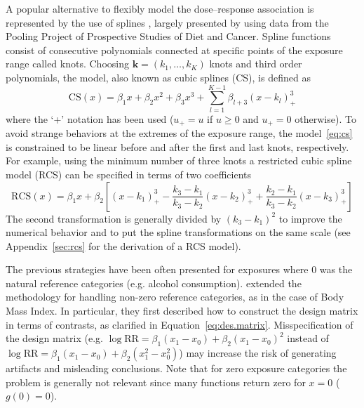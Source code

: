 \documentclass[11pt,a4paper,twoside,openany]{book}\usepackage{knitr}
\begin{document}
{{A popular alternative to flexibly model the dose--response association is represented by the use of splines \citep{de1978practical}, largely presented by \cite{orsini2011meta} using data from the Pooling Project of Prospective Studies of Diet and Cancer. Spline functions consist of consecutive polynomials connected at specific points of the exposure range called knots. Choosing $\mathbf{k} = \left(k_1, \dots, k_K\right)$ knots and third order polynomials, the model, also known as cubic splines (CS), is defined as
\begin{equation}
\mathrm{CS}(x) = \beta_1 x + \beta_2x^2 + \beta_3x^3 + \sum_{l = 1}^{K-1} \beta_{l+3}(x - k_l)_{+}^3
\label{eq:cs}
\end{equation}
\noindent where the `+' notation has been used ($u_+ = u$ if $u \ge 0$ and $u_+ = 0$ otherwise). To avoid strange behaviors at the extremes of the exposure range, the model~\ref{eq:cs} is constrained to be linear before and after the first and last knots, respectively. For example, using the minimum number of three knots a restricted cubic spline model (RCS) can be specified in terms of two coefficients
\begin{equation}
\mathrm{RCS}(x) = \beta_1 x + \beta_2 \left[ \left( x - k_1 \right)_{+}^3 - \frac{k_3 - k_1}{k_3 - k_2} \left( x - k_2  \right)_{+}^3 + \frac{k_2 - k_1}{k_3 - k_2} \left(x - k_3 \right)_{+}^3\right]
\label{eq:rcs}
\end{equation}
\noindent The second transformation is generally divided by $(k_3 - k_1)^2$ to improve the numerical behavior and to put the spline transformations on the same scale \citep{harrell2015regression} (see Appendix~\ref{sec:rcs} for the derivation of a RCS model).

The previous strategies have been often presented for exposures where 0 was the natural reference categories (e.g. alcohol consumption). \cite{liu2009two} extended the methodology for handling non-zero reference categories, as in the case of Body Mass Index. In particular, they first described how to construct the design matrix in terms of contrasts, as clarified in Equation~\ref{eq:des.matrix}. Misspecification of the design matrix (e.g. $\log \mathrm{RR} = \beta_1 (x_1 - x_0) + \beta_2 (x_1 - x_0)^2$ instead of $\log \mathrm{RR} = \beta_1 (x_1 - x_0) + \beta_2 (x_1^2 - x_0^2)$) may increase the risk of generating artifacts and misleading conclusions. Note that for zero exposure categories the problem is generally not relevant since many functions return zero for $x = 0$ ($g(0) = 0$).

}}
\end{document}
